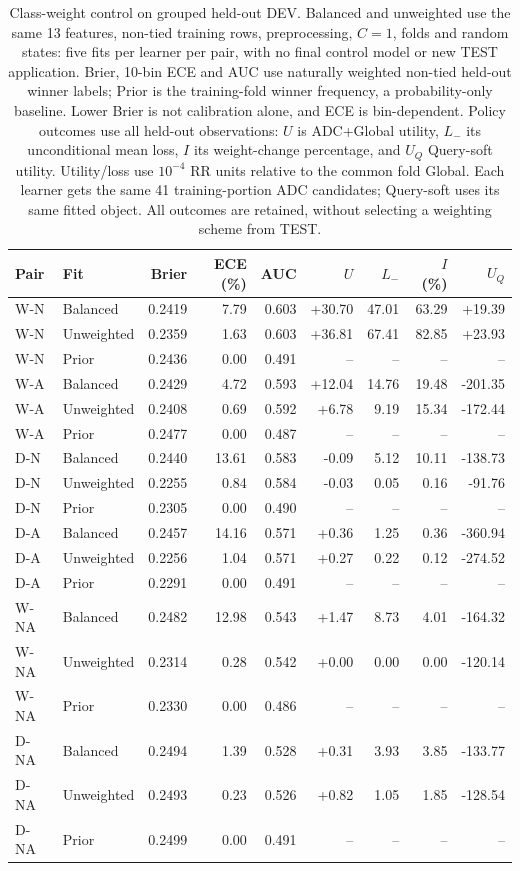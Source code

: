 \begin{table}[htbp]
\centering\footnotesize\setlength{\tabcolsep}{4pt}
\caption{Class-weight control on grouped held-out DEV. Balanced and unweighted use the same 13 features, non-tied training rows, preprocessing, $C=1$, folds and random states: five fits per learner per pair, with no final control model or new TEST application. Brier, 10-bin ECE and AUC use naturally weighted non-tied held-out winner labels; Prior is the training-fold winner frequency, a probability-only baseline. Lower Brier is not calibration alone, and ECE is bin-dependent. Policy outcomes use all held-out observations: $U$ is ADC+Global utility, $L_-$ its unconditional mean loss, $I$ its weight-change percentage, and $U_Q$ Query-soft utility. Utility/loss use $10^{-4}$ RR units relative to the common fold Global. Each learner gets the same 41 training-portion ADC candidates; Query-soft uses its same fitted object. All outcomes are retained, without selecting a weighting scheme from TEST.}
\label{tab:winner-weighting}
\begin{tabular}{llrrrrrrr}
\toprule
Pair & Fit & Brier & ECE (\%) & AUC & $U$ & $L_-$ & $I$ (\%) & $U_Q$\\
\midrule
W-N & Balanced & 0.2419 & 7.79 & 0.603 & +30.70 & 47.01 & 63.29 & +19.39\\
W-N & Unweighted & 0.2359 & 1.63 & 0.603 & +36.81 & 67.41 & 82.85 & +23.93\\
W-N & Prior & 0.2436 & 0.00 & 0.491 & -- & -- & -- & --\\
W-A & Balanced & 0.2429 & 4.72 & 0.593 & +12.04 & 14.76 & 19.48 & -201.35\\
W-A & Unweighted & 0.2408 & 0.69 & 0.592 & +6.78 & 9.19 & 15.34 & -172.44\\
W-A & Prior & 0.2477 & 0.00 & 0.487 & -- & -- & -- & --\\
D-N & Balanced & 0.2440 & 13.61 & 0.583 & -0.09 & 5.12 & 10.11 & -138.73\\
D-N & Unweighted & 0.2255 & 0.84 & 0.584 & -0.03 & 0.05 & 0.16 & -91.76\\
D-N & Prior & 0.2305 & 0.00 & 0.490 & -- & -- & -- & --\\
D-A & Balanced & 0.2457 & 14.16 & 0.571 & +0.36 & 1.25 & 0.36 & -360.94\\
D-A & Unweighted & 0.2256 & 1.04 & 0.571 & +0.27 & 0.22 & 0.12 & -274.52\\
D-A & Prior & 0.2291 & 0.00 & 0.491 & -- & -- & -- & --\\
W-NA & Balanced & 0.2482 & 12.98 & 0.543 & +1.47 & 8.73 & 4.01 & -164.32\\
W-NA & Unweighted & 0.2314 & 0.28 & 0.542 & +0.00 & 0.00 & 0.00 & -120.14\\
W-NA & Prior & 0.2330 & 0.00 & 0.486 & -- & -- & -- & --\\
D-NA & Balanced & 0.2494 & 1.39 & 0.528 & +0.31 & 3.93 & 3.85 & -133.77\\
D-NA & Unweighted & 0.2493 & 0.23 & 0.526 & +0.82 & 1.05 & 1.85 & -128.54\\
D-NA & Prior & 0.2499 & 0.00 & 0.491 & -- & -- & -- & --\\
\bottomrule
\end{tabular}
\end{table}
